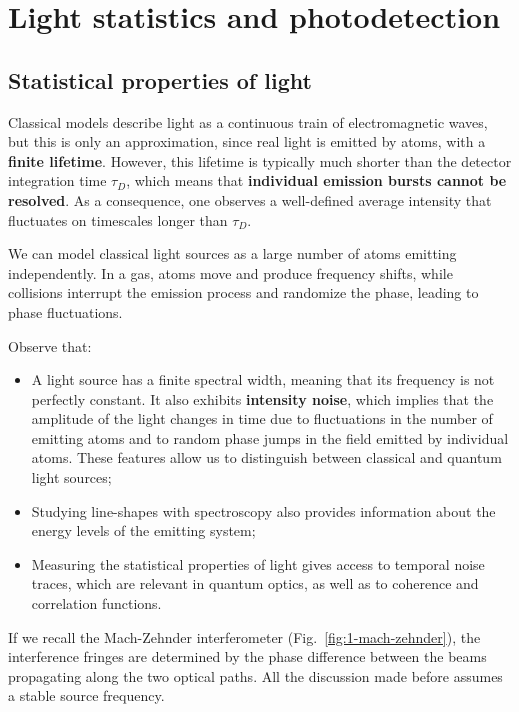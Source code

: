 \chapter{Light statistics and photodetection}\label{chap:6-stat-props-of-light}

\section{Statistical properties of light}\label{sec:stat-props-of-light}
Classical models describe light as a continuous train of electromagnetic waves, but this is only an approximation, since real light is emitted by atoms, with a \textbf{finite lifetime}. However, this lifetime is typically much shorter than the detector integration time $\tau_D$, which means that \textbf{individual emission bursts cannot be resolved}. As a consequence, one observes a well-defined average intensity that fluctuates on timescales longer than $\tau_D$. 

We can model classical light sources as a large number of atoms emitting independently. In a gas, atoms move and produce frequency shifts, while collisions interrupt the emission process and randomize the phase, leading to phase fluctuations.

Observe that:
\begin{itemize}
    \item A light source has a finite spectral width, meaning that its frequency is not perfectly constant. It also exhibits \textbf{intensity noise}, which implies that the amplitude of the light changes in time due to fluctuations in the number of emitting atoms and to random phase jumps in the field emitted by individual atoms. These features allow us to distinguish between classical and quantum light sources;
    
    \item Studying line-shapes with spectroscopy also provides information about the energy levels of the emitting system;
    
    \item Measuring the statistical properties of light gives access to temporal noise traces, which are relevant in quantum optics, as well as to coherence and correlation functions.
\end{itemize}

If we recall the Mach-Zehnder interferometer (Fig.~\ref{fig:1-mach-zehnder}), the interference fringes are determined by the phase difference between the beams propagating along the two optical paths. All the discussion made before assumes a stable source frequency.

